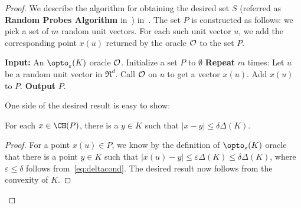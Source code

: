\begin{proof}
  We describe the algorithm for obtaining the desired set $S$ (referred as {\bf Random Probes Algorithm } in~)  in~. The set $P$ is constructed as follows: we pick a set  of $m$ random unit vectors. For each such unit vector $u$, we add the corresponding point $x(u)$ returned by the  oracle $\cal O$ to the set $P$. 

  \begin{algorithm}[H]
  \caption{Algorithm for finding the set $P$ such that $\CH(P)$ approximates $K$.}
  \label{algo:S}
    {\bf Input:} An $\opto_\varepsilon(K)$ oracle  $\cal O $. \;
        Initialize a set $P$ to $\emptyset$ \;
       {\bf Repeat} $m$ times:  \;
            \quad Let $u$ be a random unit vector in $\Re^d$. \;
            \quad Call $\cal O$ on $u$ to get a vector $x(u)$. \;
            \quad Add $x(u)$ to $P$. \;
        {\bf Output} $P$. 
\end{algorithm}

One side of the desired result is easy to show:
\begin{claim}
    \label{cl:Haus1}
    For each $x \in \CH(P)$, there is a $y \in K$ such that $|x-y| \leq \delta \Delta(K)$. 
\end{claim}
\begin{proof}
    For a point $x(u) \in P$, we know by the definition of $\opto_\varepsilon(K)$ oracle that there is a point $y \in K$ such that 
    $|x(u) - y| \leq \varepsilon \Delta(K) \leq \delta \Delta(K)$, where $\varepsilon \leq \delta$ follows from~\eqref{eq:deltacond}. The desired result now follows from the convexity of $K$. 
\end{proof}


\end{proof}

